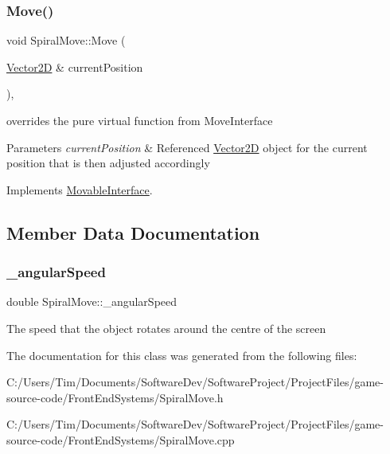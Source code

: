\subsubsection{\texorpdfstring{Move()}{Move()}}
{\footnotesize\ttfamily void Spiral\+Move\+::\+Move (\begin{DoxyParamCaption}\item[{\hyperlink{class_vector2_d}{Vector2D} \&}]{current\+Position }\end{DoxyParamCaption})\hspace{0.3cm}{\ttfamily [override]}, {\ttfamily [virtual]}}



overrides the pure virtual function from Move\+Interface 


\begin{DoxyParams}{Parameters}
{\em current\+Position} & Referenced \hyperlink{class_vector2_d}{Vector2D} object for the current position that is then adjusted accordingly \\
\hline
\end{DoxyParams}


Implements \hyperlink{class_movable_interface_a899cc1c78eacbee13b906c6770e7f025}{Movable\+Interface}.



\subsection{Member Data Documentation}
\mbox{\label{class_spiral_move_a50cae711a780fdf56fffcb279df63f37}} 
\subsubsection{\texorpdfstring{\+\_\+angular\+Speed}{\_angularSpeed}}
{\footnotesize\ttfamily double Spiral\+Move\+::\+\_\+angular\+Speed\hspace{0.3cm}{\ttfamily [private]}}

The speed that the object rotates around the centre of the screen 

The documentation for this class was generated from the following files\+:\begin{DoxyCompactItemize}
\item 
C\+:/\+Users/\+Tim/\+Documents/\+Software\+Dev/\+Software\+Project/\+Project\+Files/game-\/source-\/code/\+Front\+End\+Systems/Spiral\+Move.\+h\item 
C\+:/\+Users/\+Tim/\+Documents/\+Software\+Dev/\+Software\+Project/\+Project\+Files/game-\/source-\/code/\+Front\+End\+Systems/Spiral\+Move.\+cpp\end{DoxyCompactItemize}
